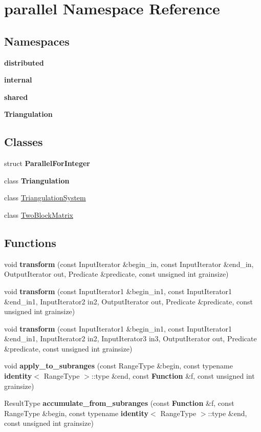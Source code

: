 \hypertarget{namespaceparallel}{}\section{parallel Namespace Reference}
\label{namespaceparallel}
\subsection*{Namespaces}
\begin{DoxyCompactItemize}
\item 
 {\bf distributed}
\item 
 {\bf internal}
\item 
 {\bf shared}
\item 
 {\bf Triangulation}
\end{DoxyCompactItemize}
\subsection*{Classes}
\begin{DoxyCompactItemize}
\item 
struct {\bf Parallel\+For\+Integer}
\item 
class {\bf Triangulation}
\item 
class \hyperlink{classparallel_1_1_triangulation_system}{Triangulation\+System}
\item 
class \hyperlink{classparallel_1_1_two_block_matrix}{Two\+Block\+Matrix}
\end{DoxyCompactItemize}
\subsection*{Functions}
\begin{DoxyCompactItemize}
\item 
void {\bf transform} (const Input\+Iterator \&begin\+\_\+in, const Input\+Iterator \&end\+\_\+in, Output\+Iterator out, Predicate \&predicate, const unsigned int grainsize)
\item 
void {\bf transform} (const Input\+Iterator1 \&begin\+\_\+in1, const Input\+Iterator1 \&end\+\_\+in1, Input\+Iterator2 in2, Output\+Iterator out, Predicate \&predicate, const unsigned int grainsize)
\item 
void {\bf transform} (const Input\+Iterator1 \&begin\+\_\+in1, const Input\+Iterator1 \&end\+\_\+in1, Input\+Iterator2 in2, Input\+Iterator3 in3, Output\+Iterator out, Predicate \&predicate, const unsigned int grainsize)
\item 
void {\bf apply\+\_\+to\+\_\+subranges} (const Range\+Type \&begin, const typename {\bf identity}$<$ Range\+Type $>$\+::type \&end, const {\bf Function} \&f, const unsigned int grainsize)
\item 
Result\+Type {\bf accumulate\+\_\+from\+\_\+subranges} (const {\bf Function} \&f, const Range\+Type \&begin, const typename {\bf identity}$<$ Range\+Type $>$\+::type \&end, const unsigned int grainsize)
\end{DoxyCompactItemize}
